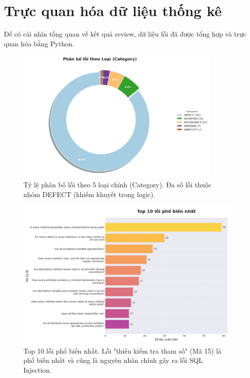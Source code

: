 \chapter{Trực quan hóa dữ liệu thống kê}
Để có cái nhìn tổng quan về kết quả review, dữ liệu lỗi đã được tổng hợp và trực quan hóa bằng Python.

\begin{figure}[htbp]
  \centering
  \includegraphics[width=0.9\textwidth]{images/bieu_do_pie_category.png}
  \caption{Tỷ lệ phân bố lỗi theo 5 loại chính (Category). Đa số lỗi thuộc nhóm DEFECT (khiếm khuyết trong logic).}
  \label{fig:pie_chart}
\end{figure}

\begin{figure}[htbp]
  \centering
  \includegraphics[width=1\textwidth]{images/bieu_do_top_10_loi.png}
  \caption{Top 10 lỗi phổ biến nhất. Lỗi "thiếu kiểm tra tham số" (Mã 15) là phổ biến nhất và cũng là nguyên nhân chính gây ra lỗi SQL Injection.}
  \label{fig:top10_chart}
\end{figure}

